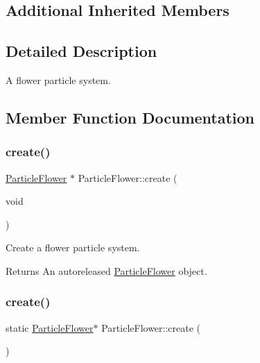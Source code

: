 \subsection*{Additional Inherited Members}


\subsection{Detailed Description}
A flower particle system. 

\subsection{Member Function Documentation}
\mbox{\label{classParticleFlower_af5c0e9c221a073113f428cf4d500fde1}} 
\subsubsection{\texorpdfstring{create()}{create()}\hspace{0.1cm}{\footnotesize\ttfamily [1/2]}}
{\footnotesize\ttfamily \hyperlink{classParticleFlower}{Particle\+Flower} $\ast$ Particle\+Flower\+::create (\begin{DoxyParamCaption}\item[{void}]{ }\end{DoxyParamCaption})\hspace{0.3cm}{\ttfamily [static]}}

Create a flower particle system.

\begin{DoxyReturn}{Returns}
An autoreleased \hyperlink{classParticleFlower}{Particle\+Flower} object. 
\end{DoxyReturn}
\mbox{\label{classParticleFlower_a4f91344e95021e6693ec17e1bb5f174f}} 
\subsubsection{\texorpdfstring{create()}{create()}\hspace{0.1cm}{\footnotesize\ttfamily [2/2]}}
{\footnotesize\ttfamily static \hyperlink{classParticleFlower}{Particle\+Flower}$\ast$ Particle\+Flower\+::create (\begin{DoxyParamCaption}{ }\end{DoxyParamCaption})\hspace{0.3cm}{\ttfamily [static]}}

